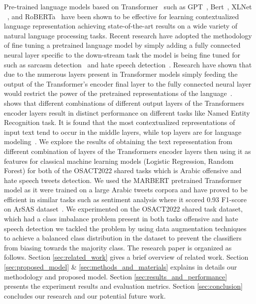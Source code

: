 \documentclass[10pt, a4paper, twoside, twocolumn]{article}
\begin{document}
Pre-trained language models based on Transformer~\cite{vaswani2017attention} such as GPT~\cite{radford2018improving}, Bert~\cite{devlin2018bert}, XLNet ~\cite{yang2019deepening}, and RoBERTa~\cite{zhuang2021robustly} have been shown to be effective for learning contextualized language representation achieving state-of-the-art results on a wide variety of natural language processing tasks.
Recent research have adopted the methodology of fine tuning a pretrained language model by simply adding a fully connected neural layer specific to the down-stream task the model is being fine tuned for such as sarcasm detection~\cite{farha2021benchmarking} and hate speech detection~\cite{aldjanabi2021arabic}. Research have shown that due to the numerous layers present in Transformer models simply feeding the output of the Transformer’s encoder final layer to the fully connected neural layer would restrict the power of the pretrained representations of the language~\cite{yang2019deepening}.~\cite{devlin2018bert} shows that different combinations of different output layers of the Transformers encoder layers result in distinct performance on different tasks like Named Entity Recognition task. It is found that the most contextualized representations of input text tend to occur in the middle layers, while top layers are for language modeling~\cite{yang2019deepening}. We explore the results of obtaining the text representation from different combination of layers of the Transformers encoder layers then using it as features for classical machine learning models (Logistic Regression, Random Forest) for both of the OSACT2022 shared tasks which is Arabic offensive and hate speech tweets detection. We used the MARBERT pretrained Transformer model as it were trained on a large Arabic tweets corpora and have proved to be efficient in similar tasks such as sentiment analysis where it scored 0.93 F1-score on ArSAS dataset~\cite{abdul-mageed-etal-2021-arbert}. We experimented on the OSACT2022 shared task dataset, which had a class imbalance problem present in both tasks offensive and hate speech detection we tackled the problem by using data augmentation techniques to achieve a balanced class distribution in the dataset to prevent the classifiers from biasing towards the majority class. The research paper is organized as follows. Section \ref{sec:related_work} gives a brief overview of related work. Section \ref{sec:proposed_model} \& \ref{sec:methods_and_materials} explains in details our methodology and proposed model. Section \ref{sec:results_and_performance} presents the experiment results  and evaluation metrics. Section \ref{sec:conclusion} concludes our research and our potential future work.
\end{document}
